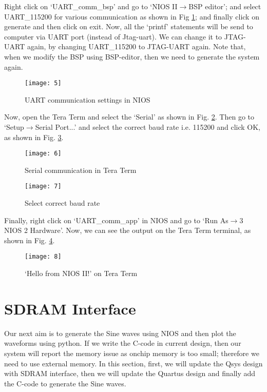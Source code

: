 Right click on `UART\_comm\_bsp' and go to `NIOS II$\rightarrow$BSP editor'; and select UART\_115200 for various communication as shown in Fig \ref{fig:nios_uart_settings}; and finally click on generate and then click on exit. Now, all the 	`printf' statements will be send to computer via UART port (instead of Jtag-uart). We can change it to JTAG-UART again, by changing UART\_115200 to JTAG-UART again. Note that, when we modify the BSP using BSP-editor, then we need to generate the system again.

\begin{figure}[!h]
	\centering
	\texttt{[image: 5]}
	\caption{UART communication settings in NIOS}
	\label{fig:nios_uart_settings}
\end{figure}

Now, open the Tera Term and select the `Serial' as shown in Fig. \ref{fig:teraTerm}. Then go to `Setup$\rightarrow$Serial Port...' and select the correct baud rate i.e. 115200 and click OK, as shown in Fig. \ref{fig:baudRateteraTerm}. 

\begin{figure}[!h]
	\centering
	\texttt{[image: 6]}
	\caption{Serial communication in Tera Term}
	\label{fig:teraTerm}
\end{figure}

\begin{figure}[!h]
	\centering
	\texttt{[image: 7]}
	\caption{Select correct baud rate}
	\label{fig:baudRateteraTerm}
\end{figure}

Finally, right click on `UART\_comm\_app' in NIOS and go to `Run As$\rightarrow$3 NIOS 2 Hardware'. Now, we can see the output on the Tera Term terminal, as shown in Fig. \ref{fig:helloTera}. 

\begin{figure}[!h]
	\centering
	\texttt{[image: 8]}
	\caption{`Hello from NIOS II!' on Tera Term}
	\label{fig:helloTera}
\end{figure}

\section{SDRAM Interface}
Our next aim is to generate the Sine waves using NIOS and then plot the waveforms using python. If we write the C-code in current design, then our system will report the memory issue as onchip memory is too small; therefore we need to use external memory. In this section, first, we will update the Qsys design with SDRAM interface, then we will update the Quartus design and finally add the C-code to generate the Sine waves. 

